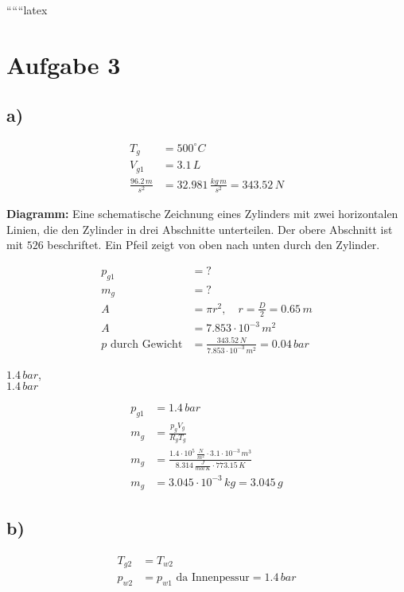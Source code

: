 
``````latex


\section*{Aufgabe 3}

\subsection*{a)}

\begin{align*}
T_g &= 500^\circ C \\
V_{g1} &= 3.1\,L \\
\frac{96.2\,m}{s^2} &= 32.981\,\frac{kg\,m}{s^2} = 343.52\,N
\end{align*}

\textbf{Diagramm:} Eine schematische Zeichnung eines Zylinders mit zwei horizontalen Linien, die den Zylinder in drei Abschnitte unterteilen. Der obere Abschnitt ist mit $526$ beschriftet. Ein Pfeil zeigt von oben nach unten durch den Zylinder.

\begin{align*}
p_{g1} &= ? \\
m_g &= ? \\
A &= \pi r^2, \quad r = \frac{D}{2} = 0.65\,m \\
A &= 7.853 \cdot 10^{-3}\,m^2 \\
p \text{ durch Gewicht} &= \frac{343.52\,N}{7.853 \cdot 10^{-3}\,m^2} = 0.04\,bar
\end{align*}

 $1.4\,bar$, \\
 $1.4\,bar$ 

\begin{align*}
p_{g1} &= 1.4\,bar \\
m_g &= \frac{p_g V_g}{R_g T_g} \\
m_g &= \frac{1.4 \cdot 10^5\,\frac{N}{m^2} \cdot 3.1 \cdot 10^{-3}\,m^3}{8.314\,\frac{J}{mol\,K} \cdot 773.15\,K} \\
m_g &= 3.045 \cdot 10^{-3}\,kg = 3.045\,g
\end{align*}

\subsection*{b)}

\begin{align*}
T_{g2} &= T_{w2} \\
p_{w2} &= p_{w1} \text{ da Innenpessur} = 1.4\,bar
\end{align*}

